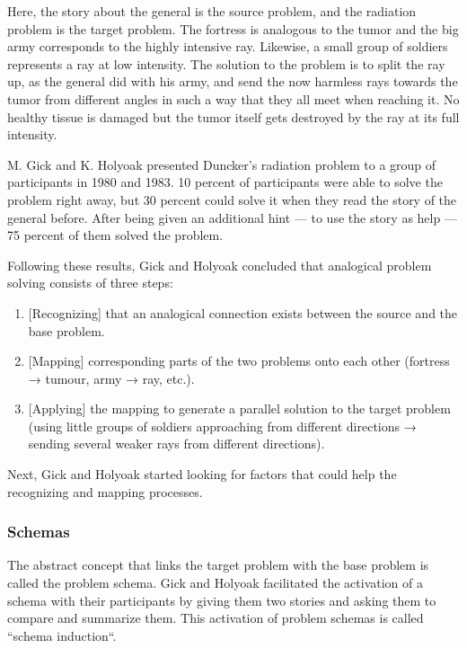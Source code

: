 \documentclass[
]{krantz}
\begin{document}
Here, the story about the general is the source problem, and the radiation problem is the target problem. The fortress is analogous to the tumor and the big army corresponds to the highly intensive ray. Likewise, a small group of soldiers represents a ray at low intensity. The solution to the problem is to split the ray up, as the general did with his army, and send the now harmless rays towards the tumor from different angles in such a way that they all meet when reaching it. No healthy tissue is damaged but the tumor itself gets destroyed by the ray at its full intensity.

M. Gick and K. Holyoak presented Duncker's radiation problem to a group of participants in 1980 and 1983. 10 percent of participants were able to solve the problem right away, but 30 percent could solve it when they read the story of the general before. After being given an additional hint --- to use the story as help --- 75 percent of them solved the problem.

Following these results, Gick and Holyoak concluded that analogical problem solving consists of three steps:

\begin{enumerate}
\def\labelenumi{\arabic{enumi}.}
\item
  {[}Recognizing{]} that an analogical connection exists between the source and the base problem.
\item
  {[}Mapping{]} corresponding parts of the two problems onto each other (fortress → tumour, army → ray, etc.).
\item
  {[}Applying{]} the mapping to generate a parallel solution to the target problem (using little groups of soldiers approaching from different directions → sending several weaker rays from different directions).
\end{enumerate}

Next, Gick and Holyoak started looking for factors that could help the recognizing and mapping processes.

\hypertarget{schemas}{%
\subsubsection*{Schemas}\label{schemas}}


The abstract concept that links the target problem with the base problem is called the problem schema. Gick and Holyoak facilitated the activation of a schema with their participants by giving them two stories and asking them to compare and summarize them. This activation of problem schemas is called ``schema induction``.
\end{document}
